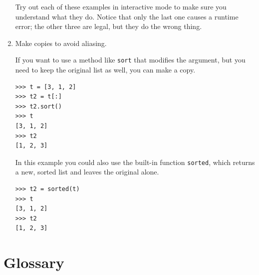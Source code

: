 \documentclass[10pt]{book}
\begin{document}
\begin{enumerate}
Try out each of these examples in interactive mode to make sure
you understand what they do.  Notice that only the last
one causes a runtime error; the other three are legal, but they
do the wrong thing.


\item Make copies to avoid aliasing.

If you want to use a method like {\tt sort} that modifies
the argument, but you need to keep the original list as
well, you can make a copy.

\begin{verbatim}
>>> t = [3, 1, 2]
>>> t2 = t[:]
>>> t2.sort()
>>> t
[3, 1, 2]
>>> t2
[1, 2, 3]
\end{verbatim}

In this example you could also use the built-in function {\tt sorted},
which returns a new, sorted list and leaves the original alone.

\begin{verbatim}
>>> t2 = sorted(t)
>>> t
[3, 1, 2]
>>> t2
[1, 2, 3]
\end{verbatim}

\end{enumerate}



\section{Glossary}
\end{document}
